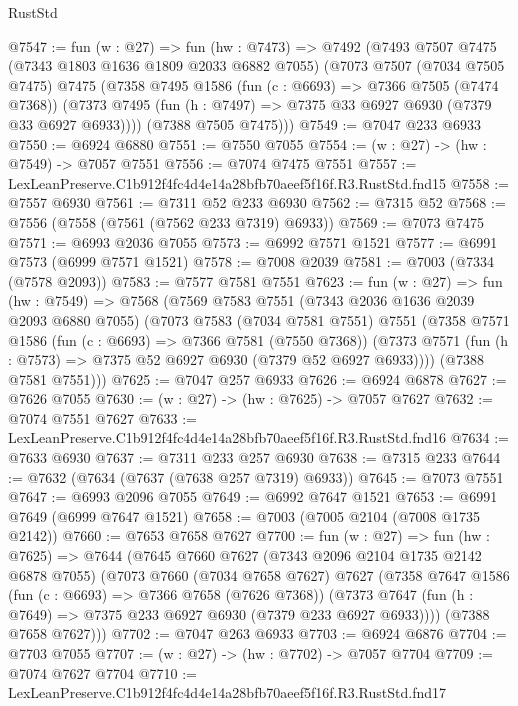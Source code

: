 \begin{lexlean}{RustStd}
\begin{coremodule}
@7547 := fun (w : @27) =>
  fun (hw : @7473) =>
  @7492
    (@7493
      @7507
      @7475
      (@7343 @1803 @1636 @1809 @2033 @6882 @7055)
      (@7073
        @7507
        (@7034 @7505 @7475)
        @7475
        (@7358
          @7495
          @1586
          (fun (c : @6693) => @7366 @7505 (@7474 @7368))
          (@7373 @7495 (fun (h : @7497) => @7375 @33 @6927 @6930 (@7379 @33 @6927 @6933))))
        (@7388 @7505 @7475)))
@7549 := @7047 @233 @6933
@7550 := @6924 @6880
@7551 := @7550 @7055
@7554 := (w : @27) -> (hw : @7549) -> @7057 @7551
@7556 := @7074 @7475 @7551
@7557 := LexLeanPreserve.C1b912f4fc4d4e14a28bfb70aeef5f16f.R3.RustStd.fnd15
@7558 := @7557 @6930
@7561 := @7311 @52 @233 @6930
@7562 := @7315 @52
@7568 := @7556 (@7558 (@7561 (@7562 @233 @7319) @6933))
@7569 := @7073 @7475
@7571 := @6993 @2036 @7055
@7573 := @6992 @7571 @1521
@7577 := @6991 @7573 (@6999 @7571 @1521)
@7578 := @7008 @2039
@7581 := @7003 (@7334 (@7578 @2093))
@7583 := @7577 @7581 @7551
@7623 := fun (w : @27) =>
  fun (hw : @7549) =>
  @7568
    (@7569
      @7583
      @7551
      (@7343 @2036 @1636 @2039 @2093 @6880 @7055)
      (@7073
        @7583
        (@7034 @7581 @7551)
        @7551
        (@7358
          @7571
          @1586
          (fun (c : @6693) => @7366 @7581 (@7550 @7368))
          (@7373 @7571 (fun (h : @7573) => @7375 @52 @6927 @6930 (@7379 @52 @6927 @6933))))
        (@7388 @7581 @7551)))
@7625 := @7047 @257 @6933
@7626 := @6924 @6878
@7627 := @7626 @7055
@7630 := (w : @27) -> (hw : @7625) -> @7057 @7627
@7632 := @7074 @7551 @7627
@7633 := LexLeanPreserve.C1b912f4fc4d4e14a28bfb70aeef5f16f.R3.RustStd.fnd16
@7634 := @7633 @6930
@7637 := @7311 @233 @257 @6930
@7638 := @7315 @233
@7644 := @7632 (@7634 (@7637 (@7638 @257 @7319) @6933))
@7645 := @7073 @7551
@7647 := @6993 @2096 @7055
@7649 := @6992 @7647 @1521
@7653 := @6991 @7649 (@6999 @7647 @1521)
@7658 := @7003 (@7005 @2104 (@7008 @1735 @2142))
@7660 := @7653 @7658 @7627
@7700 := fun (w : @27) =>
  fun (hw : @7625) =>
  @7644
    (@7645
      @7660
      @7627
      (@7343 @2096 @2104 @1735 @2142 @6878 @7055)
      (@7073
        @7660
        (@7034 @7658 @7627)
        @7627
        (@7358
          @7647
          @1586
          (fun (c : @6693) => @7366 @7658 (@7626 @7368))
          (@7373 @7647 (fun (h : @7649) => @7375 @233 @6927 @6930 (@7379 @233 @6927 @6933))))
        (@7388 @7658 @7627)))
@7702 := @7047 @263 @6933
@7703 := @6924 @6876
@7704 := @7703 @7055
@7707 := (w : @27) -> (hw : @7702) -> @7057 @7704
@7709 := @7074 @7627 @7704
@7710 := LexLeanPreserve.C1b912f4fc4d4e14a28bfb70aeef5f16f.R3.RustStd.fnd17

\end{coremodule}
\end{lexlean}
